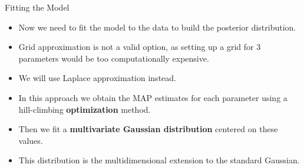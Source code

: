 \documentclass[handout]{beamer}
\begin{document}
\begin{frame}[fragile]{Fitting the Model}
\scriptsize{
\begin{itemize}
 
  \item Now we need to fit the model to the data to build the posterior distribution.
  
  \item Grid approximation is not a valid option, as setting up a grid for 3 parameters would be too computationally expensive.
  
  \item We will use Laplace approximation instead.
  
  \item In this approach we obtain the MAP estimates for each parameter using a hill-climbing \textbf{optimization} method.
  
  \item Then we fit a \textbf{multivariate Gaussian distribution} centered on these values.
  
  
  \item This distribution is the multidimensional extension to the standard Gaussian.
  

 
\end{itemize}
 

 
}
\end{frame}
\end{document}
